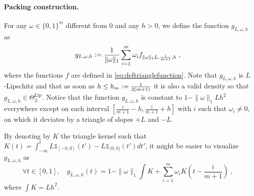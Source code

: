 \documentclass[10pt]{article} %
\def\Ind{\mathds{1}}
\newcommand{\eqdef}{\vcentcolon=}
\newcommand\p[1]{\left( {#1}\right)}
\begin{document}
    \paragraph{Packing construction.} 
    For any $\omega \in \{ 0, 1 \}^m$ different from $0$ and any $h>0$, we define the function $g_{L, \omega, h}$ as 
\begin{equation}
\label{eq:deftrianglemultiplefunction}
    g_{L, \omega, h} 
    \eqdef\frac{1}{\| \omega \|_1} \sum_{i=1}^m \omega_i f_{\| \omega \|_1 L, \frac{i}{m+1}, h} \;,
\end{equation}
where the functions $f$ are defined in \eqref{eq:deftrianglefunction}.
Note that $g_{L, \omega, h}$ is $L$-Lipschitz and that as soon as $h \leq h_m \eqdef \frac{1}{2(m+1)}$ it is also a valid density so that  $g_{L, \omega, h} \in \Theta^{\text{Lip}}_L$. Notice that the function $g_{L, \omega, h}$ is constant to $1-\| \omega \|_1 Lh^2$ everywhere except on each interval $\left[\frac{i}{m+1}-h, \frac{i}{m+1}+h\right]$ with $i$ such that $\omega_i \neq 0$, on which it deviates by a triangle of slopes $+L$ and $-L$. 

By denoting by $K$ the triangle kernel such that $K(t) = \int_{- \infty }^t L  \Ind_{[-h, 0]}(t') - L  \Ind_{(0, h]}(t') dt'$, it might be easier to visualize $g_{L, \omega, h}$ as
\begin{equation}
\label{nddgserrzw}
    \forall t \in [0, 1], \quad
    g_{L, \omega, h}(t) = 1 - \| \omega \|_1 \int K + \sum_{i=1}^m \omega_i K\p{t - \frac{i}{m+1}} \;,
\end{equation}
where $\int K = Lh^2$.
\end{document}

